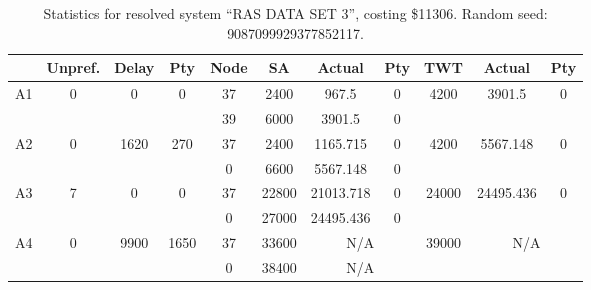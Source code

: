 \begin{sidewaystable}
\footnotesize
\caption{Statistics for resolved system ``RAS DATA SET 3'', costing \$11306. Random seed: 9087099929377852117.}
\centering
\begin{tabular}{c||c|c|c||c|c|c|c||c|c|c}
  \hline \hline
  &
  Unpref. & 
  Delay &
  Pty &
  Node &
  SA &
  Actual &
  Pty &
  TWT &
  Actual &
  Pty \\
      \hline
      \multirow{2}{*}{A1} &
      \multirow{2}{*}{0} &
      \multirow{2}{*}{0} &
      \multirow{2}{*}{0} &
      37 &
      2400 &
        967.5 &
        0 &
      \multirow{2}{*}{4200} &
        \multirow{2}{*}{3901.5} &
        \multirow{2}{*}{0}
      \\
      \cline{5-8}
       &
       &
       &
       &
      39 &
      6000 &
        3901.5 &
        0 &
      
         &
        
      \\
      \hline
      \multirow{2}{*}{A2} &
      \multirow{2}{*}{0} &
      \multirow{2}{*}{1620} &
      \multirow{2}{*}{270} &
      37 &
      2400 &
        1165.715 &
        0 &
      \multirow{2}{*}{4200} &
        \multirow{2}{*}{5567.148} &
        \multirow{2}{*}{0}
      \\
      \cline{5-8}
       &
       &
       &
       &
      0 &
      6600 &
        5567.148 &
        0 &
      
         &
        
      \\
      \hline
      \multirow{2}{*}{A3} &
      \multirow{2}{*}{7} &
      \multirow{2}{*}{0} &
      \multirow{2}{*}{0} &
      37 &
      22800 &
        21013.718 &
        0 &
      \multirow{2}{*}{24000} &
        \multirow{2}{*}{24495.436} &
        \multirow{2}{*}{0}
      \\
      \cline{5-8}
       &
       &
       &
       &
      0 &
      27000 &
        24495.436 &
        0 &
      
         &
        
      \\
      \hline
      \multirow{2}{*}{A4} &
      \multirow{2}{*}{0} &
      \multirow{2}{*}{9900} &
      \multirow{2}{*}{1650} &
      37 &
      33600 &
        \multicolumn{2}{|c||}{N/A} &
      \multirow{2}{*}{39000} &
        \multicolumn{2}{c}{\multirow{2}{*}{N/A}}
      \\
      \cline{5-8}
       &
       &
       &
       &
      0 &
      38400 &
        \multicolumn{2}{|c||}{N/A} &
      

\end{tabular}
\end{sidewaystable}
